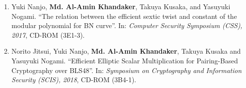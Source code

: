 \begin{itemize}
\begin{enumerate}
	\item Yuki Nanjo,  \textbf{Md. Al-Amin Khandaker}, Takuya Kusaka, and  Yasuyuki Nogami. ``The relation between the efficient sextic twist and constant of the modular polynomial for BN curve''. In: \textit{Computer Security Symposium  (CSS),  2017}, CD-ROM (3E1-3). 
	
	\item  Norito Jitsui, Yuki Nanjo, \textbf{Md. Al-Amin Khandaker}, Takuya Kusaka and Yasuyuki Nogami. ``Efficient Elliptic Scalar Multiplication for Pairing-Based Cryptography over BLS48''. In:  \textit{Symposium on Cryptography and Information Security (SCIS),  2018}, CD-ROM (3B4-1).
\end{enumerate}
\normalsize
\end{itemize}


